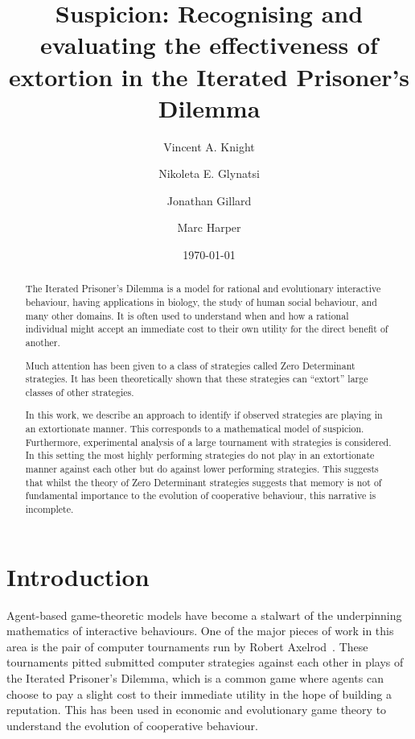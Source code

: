 \documentclass[a4paper]{article}
\title{Suspicion: Recognising and evaluating the effectiveness
       of extortion in the Iterated Prisoner's Dilemma}
\author{Vincent A. Knight \and
        Nikoleta E. Glynatsi \and
        Jonathan Gillard \and
        Marc Harper}
\date{\today}
\begin{document}
\maketitle

\begin{abstract}
    The Iterated Prisoner's Dilemma is a model for rational and evolutionary
    interactive behaviour, having applications in biology, the study of human
    social behaviour, and many other domains.  It is often used to understand
    when and how a rational individual might accept an immediate cost to their
    own utility for the direct benefit of another.

    Much attention has been given to a class of strategies called
    Zero Determinant strategies. It has been theoretically shown that these
    strategies can ``extort'' large classes of other strategies.

    In this work, we describe an approach to identify if observed strategies are
    playing in an extortionate manner. This corresponds to a mathematical model
    of suspicion. Furthermore, experimental analysis of a large tournament with
    strategies is
    considered. In this setting the most highly performing strategies do not
    play in an extortionate manner against each other but do against lower
    performing strategies.  This suggests that whilst the theory of Zero
    Determinant strategies suggests that memory is not of fundamental importance
    to the evolution of cooperative behaviour, this narrative is incomplete.
\end{abstract}

\section{Introduction}\label{sec:introduction}

Agent-based game-theoretic models have become a stalwart of the underpinning
mathematics of interactive behaviours. One of the major pieces of work in this
area is the pair of computer tournaments run by Robert
Axelrod~\cite{Axelrod1980, Axelrod1980a}. These tournaments pitted submitted
computer strategies against each other in plays of the Iterated Prisoner's
Dilemma, which is a common game where agents can choose to pay a slight cost to
their immediate utility in the hope of building a reputation. This has been used
in economic and evolutionary game theory to understand the evolution of
cooperative behaviour.
\end{document}
